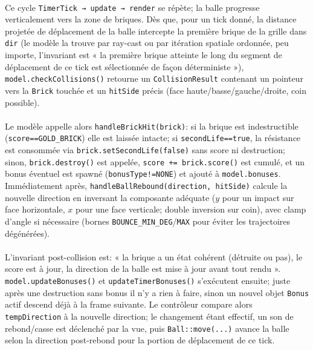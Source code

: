 \documentclass[12pt]{article}
\begin{document}
\paragraph{}
Ce cycle \texttt{TimerTick → update → render} se répète; la balle progresse verticalement vers la zone de briques. Dès que, pour un tick donné, la distance projetée de déplacement de la balle intercepte la première brique de la grille dans \texttt{dir} (le modèle la trouve par ray-cast ou par itération spatiale ordonnée, peu importe, l’invariant est « la première brique atteinte le long du segment de déplacement de ce tick est sélectionnée de façon déterministe »), \colorbox{gray!20}{\texttt{model.checkCollisions()}} retourne un \texttt{CollisionResult} contenant un pointeur vers la \colorbox{gray!20}{\texttt{Brick}} touchée et un \texttt{hitSide} précis (face haute/basse/gauche/droite, coin possible). 

\paragraph{}

Le modèle appelle alors \colorbox{gray!20}{\texttt{handleBrickHit(brick)}}: si la brique est indestructible (\texttt{score==GOLD\_BRICK}) elle est laissée intacte; si \texttt{secondLife==true}, la résistance est consommée via \colorbox{gray!20}{\texttt{brick.setSecondLife(false)}} sans score ni destruction; sinon, \colorbox{gray!20}{\texttt{brick.destroy()}} est appelée, \texttt{score += brick.score()} est cumulé, et un bonus éventuel est spawné (\texttt{bonusType!=NONE}) et ajouté à \texttt{model.bonuses}. Immédiatement après, \colorbox{gray!20}{\texttt{handleBallRebound(direction, hitSide)}} calcule la nouvelle direction en inversant la composante adéquate ($y$ pour un impact sur face horizontale, $x$ pour une face verticale; double inversion sur coin), avec clamp d’angle si nécessaire (bornes \texttt{BOUNCE\_MIN\_DEG}/\texttt{MAX} pour éviter les trajectoires dégénérées).


\paragraph{}

L’invariant post-collision est: « la brique a un état cohérent (détruite ou pas), le score est à jour, la direction de la balle est mise à jour avant tout rendu ». \colorbox{gray!20}{\texttt{model.updateBonuses()}} et \colorbox{gray!20}{\texttt{updateTimerBonuses()}} s’exécutent ensuite; juste après une destruction sans bonus il n’y a rien à faire, sinon un nouvel objet \colorbox{gray!20}{\texttt{Bonus}} actif descend déjà à la frame suivante. Le contrôleur compare alors \texttt{tempDirection} à la nouvelle direction; le changement étant effectif, un son de rebond/casse est déclenché par la vue, puis \colorbox{gray!20}{\texttt{Ball::move(...)}} avance la balle selon la direction post-rebond pour la portion de déplacement de ce tick. 
\end{document}
